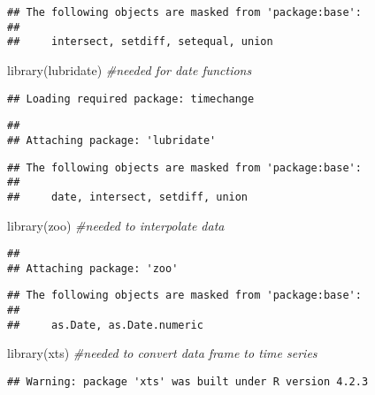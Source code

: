 \documentclass[
]{article}
\newenvironment{Shaded}{\begin{snugshade}}{\end{snugshade}}
\newcommand{\CommentTok}[1]{\textcolor[rgb]{0.56,0.35,0.01}{\textit{#1}}}
\newcommand{\FunctionTok}[1]{\textcolor[rgb]{0.00,0.00,0.00}{#1}}
\newcommand{\NormalTok}[1]{#1}
\begin{document}
\begin{verbatim}
## The following objects are masked from 'package:base':
## 
##     intersect, setdiff, setequal, union
\end{verbatim}

\begin{Shaded}
\begin{Highlighting}[]
\FunctionTok{library}\NormalTok{(lubridate) }\CommentTok{\#needed for date functions}
\end{Highlighting}
\end{Shaded}

\begin{verbatim}
## Loading required package: timechange
\end{verbatim}

\begin{verbatim}
## 
## Attaching package: 'lubridate'
\end{verbatim}

\begin{verbatim}
## The following objects are masked from 'package:base':
## 
##     date, intersect, setdiff, union
\end{verbatim}

\begin{Shaded}
\begin{Highlighting}[]
\FunctionTok{library}\NormalTok{(zoo) }\CommentTok{\#needed to interpolate data}
\end{Highlighting}
\end{Shaded}

\begin{verbatim}
## 
## Attaching package: 'zoo'
\end{verbatim}

\begin{verbatim}
## The following objects are masked from 'package:base':
## 
##     as.Date, as.Date.numeric
\end{verbatim}

\begin{Shaded}
\begin{Highlighting}[]
\FunctionTok{library}\NormalTok{(xts) }\CommentTok{\#needed to convert data frame to time series}
\end{Highlighting}
\end{Shaded}

\begin{verbatim}
## Warning: package 'xts' was built under R version 4.2.3
\end{verbatim}
\end{document}
